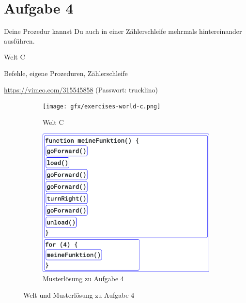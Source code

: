 \pagebreak

\section*{Aufgabe 4}
\label{sec:exercises:4}

Deine Prozedur kannst Du auch in einer Zählerschleife mehrmals hintereinander ausführen.

\begin{description}[noitemsep]
  \item[Welt wählen:] Welt C
  \item[Du brauchst:] Befehle, eigene Prozeduren, Zählerschleife
  \item[Video:] \url{https://vimeo.com/315545858} (Passwort: trucklino)
\end{description}

\begin{figure}[H]
  \begin{subfigure}[b]{0.40\textwidth}
    \texttt{[image: gfx/exercises-world-c.png]}
    \caption{Welt C}
  \end{subfigure}\hfill
  \begin{subfigure}[b]{0.40\textwidth}
    \includegraphics[width=\textwidth]{gfx/exercises-program-4.png}
    \caption{Musterlösung zu Aufgabe 4}
  \end{subfigure}\hfill
  \caption{Welt und Musterlösung zu Aufgabe 4}
\end{figure}

\pagebreak


